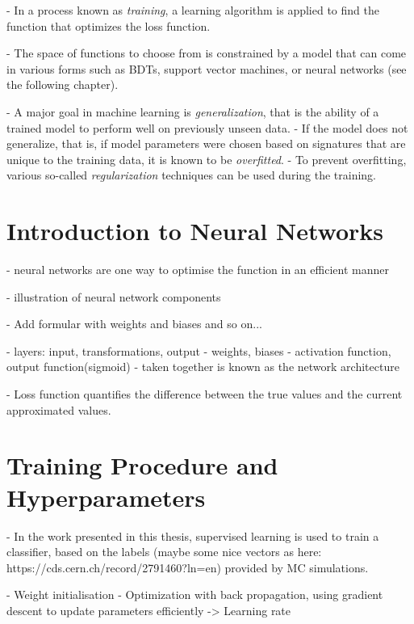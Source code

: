 - In a process known as \emph{training}, a learning algorithm is applied to find the function that optimizes the loss function.

- The space of functions to choose from is constrained by a model that can come in various forms such as BDTs, support vector machines, or neural networks (see the following chapter).

- A major goal in machine learning is \emph{generalization}, that is the ability of a trained model to perform well on previously unseen data.  
- If the model does not generalize, that is, if model parameters were chosen based on signatures that are unique to the training data, it is known to be \emph{overfitted}. 
- To prevent overfitting, various so-called \emph{regularization} techniques can be used during the training. 




\section{Introduction to Neural Networks}
- neural networks are one way to optimise the function in an efficient manner

- illustration of neural network components

- Add formular with weights and biases and so on...

- layers: input, transformations, output
- weights, biases
- activation function, output function(sigmoid)
- taken together is known as the network architecture

- Loss function quantifies the difference between the true values and the current approximated values.


\section{Training Procedure and Hyperparameters}
- In the work presented in this thesis, supervised learning is used to train a classifier, based on the labels (maybe some nice vectors as here: https://cds.cern.ch/record/2791460?ln=en) provided by MC simulations.


- Weight initialisation
- Optimization with back propagation, using gradient descent to update parameters efficiently
    -> Learning rate
    
